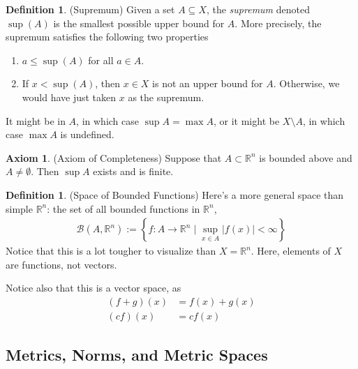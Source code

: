 \documentclass[12pt]{article}
\numberwithin{equation}{section} %
\theoremstyle{plain}
\theoremstyle{definition}
\newtheorem{ax}[thm]{Axiom}
\newtheorem{defn}[thm]{Definition}
\theoremstyle{remark}
\newcommand{\R}{\mathbb{R}}
\begin{document}
\begin{defn}{(Supremum)}
\label{defn:supdef1}
Given a set $A\subseteq X$, the \emph{supremum} denoted $\sup(A)$ is the
smallest possible upper bound for $A$.
More precisely, the supremum satisfies the following two properties
\begin{enumerate}
  \item $a\leq \sup(A)$ for all $a\in A$.
  \item If $x<\sup(A)$, then $x\in X$ is not an upper bound for $A$.
    Otherwise, we would have just taken $x$ as the supremum.
\end{enumerate}
It might be in $A$, in which case $\sup A = \max A$, or it might be
$X\setminus A$, in which case $\max A$ is undefined.
\end{defn}

\begin{ax}{(Axiom of Completeness)}
\label{ax:completeness}
Suppose that $A\subset \R^n$ is bounded above and $A\neq
\emptyset$. Then $\sup A$ exists and is finite.
\end{ax}

\begin{defn}{(Space of Bounded Functions)}
Here's a more general space than simple $\R^n$: the set of all
bounded functions in $\R^n$,
\begin{align*}
  \mathscr{B}(A,\R^n)
  :=
  \left\{
    f:A\rightarrow \R^n \; \big| \; \sup_{x\in A} |f(x)|<\infty
  \right\}
\end{align*}
Notice that this is a lot tougher to visualize than $X=\R^n$.
Here, elements of $X$ are functions, not vectors.

Notice also that this is a vector space, as
\begin{align*}
  (f+g)(x) &= f(x) + g(x)\\
  (cf)(x) &= cf(x)
\end{align*}
\end{defn}



\clearpage
\subsection{Metrics, Norms, and Metric Spaces}
\end{document}
